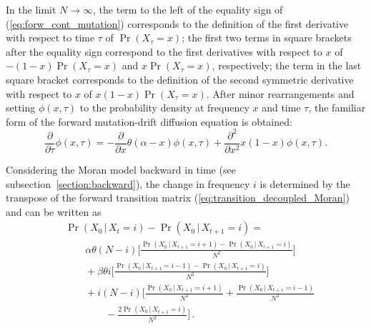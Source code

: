 \documentclass[preprint]{elsarticle}
\newcommand\given{{\,|\,}}
\newcommand\x[1]{\ensuremath{X_{#1}}}
\begin{document}
In the limit $N \to \infty$, the term to the left of the equality sign of (\ref{eq:forw_cont_mutation}) corresponds to the definition of the first derivative with respect to time $\tau$ of $\Pr(\x{\tau}=x)$; the first two terms in square brackets after the equality sign correspond to the first derivatives with respect to $x$ of $-(1-x)\Pr(\x{\tau}=x)$ and $x\Pr(\x{\tau}=x)$, respectively; the term in the last square bracket corresponds to the definition of the second symmetric derivative with respect to $x$ of $x(1-x)\Pr(\x{\tau}=x)$.  After minor rearrangements and setting $\phi(x,\tau)$ to the probability density at frequency $x$ and time $\tau$, the familiar form of the forward mutation-drift diffusion equation is obtained:
\begin{equation}\label{eq:forw_mutdrift}
\frac{\partial}{\partial \tau} \phi(x,\tau) = -\frac{\partial}{\partial x}\theta(\alpha-x)\phi(x,\tau) +\frac{\partial^2}{\partial x^2}x(1-x)\phi(x,\tau).
\end{equation}

Considering the Moran model backward in time (see subsection~\ref{section:backward}), the change in frequency $i$ is determined by the transpose of the forward transition matrix (\ref{eq:transition_decoupled_Moran}) and can be written as
\begin{equation}\label{eq:back_discr_mutation}
\begin{split}
&\Pr(\x{0} \given\x{t}=i)-\Pr(\x{0}\given\x{t+1}=i) = \\
&\qquad \alpha \theta (N-i) \bigg[\frac{\Pr(\x{0}\given\x{t+1}=i+1)-\Pr(\x{0}\given\x{t+1}=i)}{N^2}\bigg]\\
&\qquad+\beta \theta i \bigg[\frac{\Pr(\x{0}\given\x{t+1}=i-1)-\Pr(\x{0}\given\x{t+1}=i)}{N^2}\bigg]\\
&\qquad+i(N-i) \bigg[\frac{\Pr(\x{0}\given\x{t+1}=i+1)}{N^2}+\frac{\Pr(\x{0}\given\x{t+1}=i-1)}{N^2}\\
&\qquad\qquad-\frac{2\Pr(\x{0}\given\x{t+1}=i)}{N^2}\bigg]\,.
\end{split}
\end{equation}
\end{document}
